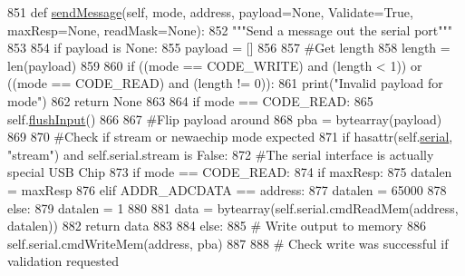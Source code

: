 \begin{DoxyCode}
851     \textcolor{keyword}{def }\hyperlink{classsoftware_1_1chipwhisperer_1_1capture_1_1scopes_1_1__OpenADCInterface_1_1OpenADCInterface_a7dedd91236e9343988d1f6e169f8f9a4}{sendMessage}(self, mode, address, payload=None, Validate=True, maxResp=None, 
      readMask=None):
852         \textcolor{stringliteral}{"""Send a message out the serial port"""}
853 
854         \textcolor{keywordflow}{if} payload \textcolor{keywordflow}{is} \textcolor{keywordtype}{None}:
855             payload = []
856 
857         \textcolor{comment}{#Get length}
858         length = len(payload)
859 
860         \textcolor{keywordflow}{if} ((mode == CODE\_WRITE) \textcolor{keywordflow}{and} (length < 1)) \textcolor{keywordflow}{or} ((mode == CODE\_READ) \textcolor{keywordflow}{and} (length != 0)):
861             print(\textcolor{stringliteral}{"Invalid payload for mode"})
862             \textcolor{keywordflow}{return} \textcolor{keywordtype}{None}
863 
864         \textcolor{keywordflow}{if} mode == CODE\_READ:
865             self.\hyperlink{classsoftware_1_1chipwhisperer_1_1capture_1_1scopes_1_1__OpenADCInterface_1_1OpenADCInterface_a627f33d47a6e3e44a60b6dfafa4bb84b}{flushInput}()
866 
867         \textcolor{comment}{#Flip payload around}
868         pba = bytearray(payload)
869         
870         \textcolor{comment}{#Check if stream or newaechip mode expected}
871         \textcolor{keywordflow}{if} hasattr(self.\hyperlink{classsoftware_1_1chipwhisperer_1_1capture_1_1scopes_1_1__OpenADCInterface_1_1OpenADCInterface_a1977480cbd539ad71c75f7b1f9c99af5}{serial}, \textcolor{stringliteral}{"stream"}) \textcolor{keywordflow}{and} self.serial.stream \textcolor{keywordflow}{is} \textcolor{keyword}{False}:
872             \textcolor{comment}{#The serial interface is actually special USB Chip}
873             \textcolor{keywordflow}{if} mode == CODE\_READ:
874                 \textcolor{keywordflow}{if} maxResp:
875                     datalen = maxResp
876                 \textcolor{keywordflow}{elif} ADDR\_ADCDATA == address:
877                     datalen = 65000
878                 \textcolor{keywordflow}{else}:
879                     datalen = 1
880 
881                 data = bytearray(self.serial.cmdReadMem(address, datalen))
882                 \textcolor{keywordflow}{return} data
883             
884             \textcolor{keywordflow}{else}:
885                 \textcolor{comment}{# Write output to memory}
886                 self.serial.cmdWriteMem(address, pba)
887                 
888                 \textcolor{comment}{# Check write was successful if validation requested}

\end{DoxyCode}
